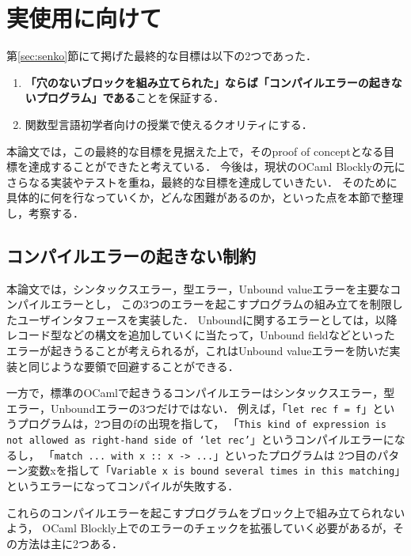 \section {実使用に向けて}\label{sub:later}

第\ref{sec:senko}節にて掲げた最終的な目標は以下の2つであった．
\begin {enumerate}
  \item {\bf 「穴のないブロックを組み立てられた」ならば「コンパイルエラーの起きないプログラム」である}ことを保証する．
  \item 関数型言語初学者向けの授業で使えるクオリティにする．
\end {enumerate}

本論文では，この最終的な目標を見据えた上で，そのproof of conceptとなる目標を達成することができたと考えている．
今後は，現状のOCaml Blocklyの元にさらなる実装やテストを重ね，最終的な目標を達成していきたい．
そのために具体的に何を行なっていくか，どんな困難があるのか，といった点を本節で整理し，考察する．

\subsection*{コンパイルエラーの起きない制約}

本論文では，シンタックスエラー，型エラー，Unbound valueエラーを主要なコンパイルエラーとし，
この3つのエラーを起こすプログラムの組み立てを制限したユーザインタフェースを実装した．
Unboundに関するエラーとしては，以降レコード型などの構文を追加していくに当たって，Unbound fieldなどといったエラーが起きうることが考えられるが，これはUnbound valueエラーを防いだ実装と同じような要領で回避することができる．

一方で，標準のOCamlで起きうるコンパイルエラーはシンタックスエラー，型エラー，Unboundエラーの3つだけではない．
例えば，「{\tt let rec f = f}」というプログラムは，2つ目のfの出現を指して，
「{\tt This kind of expression is not allowed as right-hand side of `let rec'}」というコンパイルエラーになるし，
「{\tt match ... with x ::\ x -> ...}」といったプログラムは
2つ目のパターン変数xを指して「{\tt Variable x is bound several times in this matching}」というエラーになってコンパイルが失敗する．

これらのコンパイルエラーを起こすプログラムをブロック上で組み立てられないよう，
OCaml Blockly上でのエラーのチェックを拡張していく必要があるが，その方法は主に2つある．

